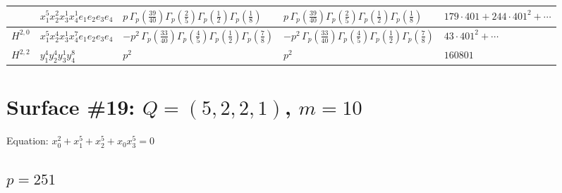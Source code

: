 \documentclass[11pt]{article}
\begin{document}
\begin{table}[ht]
{\begin{tabular}{@{}lllll@{}}
 & $x_{1}^{5} x_{2}^{2} x_{3}^{1} x_{4}^{1}  e_{1} e_{2} e_{3} e_{4}$ & $p \, \Gamma_p \left( \frac{39}{40} \right) \Gamma_p \left( \frac{2}{5} \right) \Gamma_p \left( \frac{1}{2} \right) \Gamma_p \left( \frac{1}{8} \right)$ & $p \, \Gamma_p \left( \frac{39}{40} \right) \Gamma_p \left( \frac{2}{5} \right) \Gamma_p \left( \frac{1}{2} \right) \Gamma_p \left( \frac{1}{8} \right)$ & $179{\cdot}401{+}244{\cdot}401^{2}{+}\cdots$ \\
\midrule
$H^{2,0}$ & $x_{1}^{5} x_{2}^{4} x_{3}^{1} x_{4}^{7}  e_{1} e_{2} e_{3} e_{4}$ & $- p^{2} \, \Gamma_p \left( \frac{33}{40} \right) \Gamma_p \left( \frac{4}{5} \right) \Gamma_p \left( \frac{1}{2} \right) \Gamma_p \left( \frac{7}{8} \right)$ & $- p^{2} \, \Gamma_p \left( \frac{33}{40} \right) \Gamma_p \left( \frac{4}{5} \right) \Gamma_p \left( \frac{1}{2} \right) \Gamma_p \left( \frac{7}{8} \right)$ & $43{\cdot}401^{2}{+}\cdots$ \\
\midrule
$H^{2,2}$ & $y_{1}^{4} y_{2}^{4} y_{3}^{1} y_{4}^{8}$ & $p^{2} \,$ & $p^{2} \,$ & $160801$ \\
\bottomrule
\end{tabular}
}
\renewcommand{\arraystretch}{1.0}
\end{table}

\newpage

\section*{Surface \#19: $Q=(5, 2, 2, 1)$, $m=10$}

Equation: $x_0^{2} + x_1^{5} + x_2^{5} + x_0 x_3^{5} = 0$

\subsection*{$p = 251$}
\end{document}
